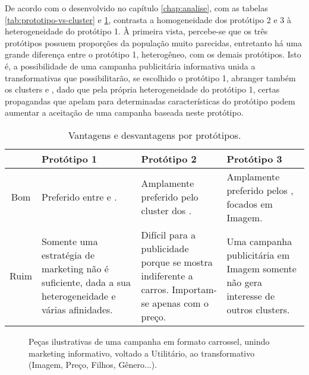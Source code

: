 \label{chap:conclusao}

De acordo com o desenvolvido no capítulo \ref{chap:analise}, com
as tabelas \ref{tab:prototipo-vs-cluster} e \ref{tab:prototipo-analise},
contrasta a homogeneidade dos protótipo 2 e 3 à heterogeneidade do
protótipo 1. À primeira vista, percebe-se que os três protótipos possuem
proporções da população muito parecidas, entretanto há uma grande
diferença entre o protótipo 1, heterogêneo, com os demais protótipos.
Isto é, a possibilidade de uma campanha publicitária informativa unida
a transformativas que possibilitarão, se escolhido o protótipo 1,
abranger também os clusters \nomeCc{} e \nomeCb{}, dado que pela
própria heterogeneidade do protótipo 1, certas propagandas que apelam
para determinadas características do protótipo podem aumentar a aceitação
de uma campanha baseada neste protótipo.

\begin{table}
\begin{centering}
\begin{tabular}{c|>{\centering}p{}|>{\centering}p{}|>{\centering}p{}}
\hline 
 & Protótipo 1 & Protótipo 2 & Protótipo 3\tabularnewline
\hline 
Bom & Preferido entre \nomeCa{} e \nomeCd{}. & Amplamente preferido pelo cluster dos \nomeCc{}. & Amplamente preferido pelos \nomeCb{}, focados em Imagem.\tabularnewline
\hline 
Ruim & Somente uma estratégia de marketing não é suficiente, dada a sua heterogeneidade
e várias afinidades. & Difícil para a publicidade porque se mostra indiferente a carros.
Importam-se apenas com o preço. & Uma campanha publicitária em Imagem somente não gera interesse de
outros clusters.\tabularnewline
\hline 
\end{tabular}
\par\end{centering}
\caption{\label{tab:prototipo-analise}Vantagens e desvantagens por protótipos.}
\end{table}

\begin{figure}
\begin{centering}
\par\end{centering}
\caption{Peças ilustrativas de uma campanha em formato carrossel, unindo marketing informativo, voltado a Utilitário, ao transformativo (Imagem, Preço, Filhos, Gênero...).}
\end{figure}


